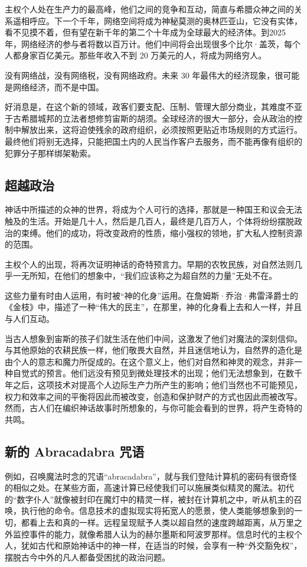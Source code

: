 主权个人处在生产力的最高峰，他们之间的竞争和互动，简直与希腊众神之间的关系遥相呼应。下一个千年，网络空间将成为神秘莫测的奥林匹亚山，它没有实体，看不见摸不着，但有望在新千年的第二个十年成为全球最大的经济体。到2025 年，网络经济的参与者将数以百万计。他们中间将会出现很多个比尔·盖茨，每个人都身家百亿美元。那些年收入不到 20 万美元的人，将成为网络穷人。


没有网络战，没有网络税，没有网络政府。未来 30 年最伟大的经济现象，很可能是网络经济，而不是中国。


好消息是，在这个新的领域，政客们要支配、压制、管理大部分商业，其难度不亚于古希腊城邦的立法者想修剪宙斯的胡须。全球经济的很大一部分，会从政治的控制中解放出来，这将迫使残余的政府组织，必须按照更贴近市场规则的方式运行。最终他们将别无选择，只能把国土内的人民当作客户去服务，而不能再像有组织的犯罪分子那样绑架勒索。



\subsection{超越政治}
神话中所描述的众神的世界，将成为个人可行的选择，那就是一种国王和议会无法触及的生活。开始是几十人，然后是几百人，最终是几百万人，个体将纷纷摆脱政治的束缚。他们的成功，将改变政府的性质，缩小强权的领地，扩大私人控制资源的范围。


主权个人的出现，将再次证明神话的奇特预言力。早期的农牧民族，对自然法则几乎一无所知，在他们的想象中，“我们应该称之为超自然的力量”无处不在。


这些力量有时由人运用，有时被“神的化身”运用。在詹姆斯·乔治·弗雷泽爵士的《金枝》中，描述了一种“伟大的民主”，在那里，神的化身看上去和人一样，并且与人们互动。


当古人想象到宙斯的孩子们就生活在他们中间，这激发了他们对魔法的深刻信仰。与其他原始的农耕民族一样，他们敬畏大自然，并且迷信地认为，自然界的造化是由个人的意志和魔力所促成的。在这个意义上，他们对自然和神灵的观念，并非一种自觉式的预言。他们远没有预见到微处理技术的出现；他们无法想象到，在数千年之后，这项技术对提高个人边际生产力所产生的影响；他们当然也不可能预见，权力和效率之间的平衡将因此而被改变，创造和保护财产的方式也因此而被改写。然而，古人们在编织神话故事时所想象的，与你可能会看到的世界，将产生奇特的共鸣。



\subsection{新的 Abracadabra 咒语}
例如，召唤魔法时念的咒语“abracadabra”，就与我们登陆计算机的密码有很奇怪的相似之处。在某些方面，高速计算已经使我们可以施展类似精灵的魔法。初代的“数字仆人”就像被封印在魔灯中的精灵一样，被封在计算机之中，听从机主的召唤，执行他的命令。信息技术的虚拟现实将拓宽人的愿景，使人类能够想象到的一切，都看上去和真的一样。远程呈现赋予人类以超自然的速度跨越距离，从万里之外监控事件的能力，就像希腊人认为的赫尔墨斯和阿波罗那样。信息时代的主权个人，犹如古代和原始神话中的神一样，在适当的时候，会享有一种“外交豁免权”，摆脱古今中外的凡人都备受困扰的政治问题。


